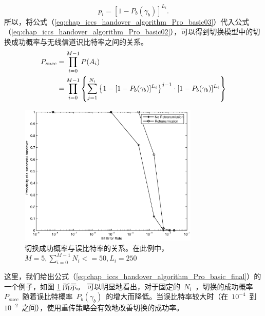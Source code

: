 \begin{equation}\label{eq:chap_iccs_handover_algorithm_Pro_basic03}
p_{i}=[1-P_{b}(\gamma_{b})]^{L_{i}}.
\end{equation}
所以，将公式（\ref{eq:chap_iccs_handover_algorithm_Pro_basic03}）代入公式（\ref{eq:chap_iccs_handover_algorithm_Pro_basic02}），可以得到切换模型中的切换成功概率与无线信道识比特率之间的关系。
\begin{align}
\label{eq:chap_iccs_handover_algorithm_Pro_basic_final}
\notag P_{succ}&=\prod_{i=0}^{M-1}P(A_{i})\\
&=\prod_{i=0}^{M-1}\left\{ \sum_{j=1}^{N_{i}}\left\{ 1-[1-P_{b}(\gamma_{b})]^{L_{i}}\right\} ^{j-1} \cdot[1-P_{b}(\gamma_{b})]^{L_{i}}\right\}
\end{align}
\begin{figure}[t]
\begin{centering}
\includegraphics[height=6.75cm]{iccs_ber_prob}
\par\end{centering}
\caption{切换成功概率与误比特率的关系。在此例中，~$M=5,\sum_{i=0}^{M-1}N_i<=50,L_i=250$~}
\label{fig:chap_iccs_handover_algorithm_PBER}
\end{figure}
这里，我们给出公式（\ref{eq:chap_iccs_handover_algorithm_Pro_basic_final}）的一个例子，如图 \ref{fig:chap_iccs_handover_algorithm_PBER} 所示。
可以明显地看出，对于固定的~$N_i$~，切换的成功概率~$P_{succ}$~随着误比特概率~$P_b(\gamma_b)$~的增大而降低。当误比特率较大时（在~$10^{-4}$~到~$10^{-2}$~之间），使用重传策略会有效地改善切换的成功率。

